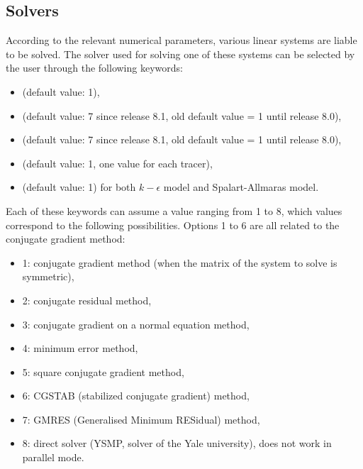 \subsection{Solvers}
\label{sec:solver}
According to the relevant numerical parameters, various linear systems are
liable to be solved. The solver used for solving one of these systems can be
selected by the user through the following keywords:

\begin{itemize}
\item {} (default value: 1),

\item {} (default value: 7
  since release 8.1, old default value = 1 until release 8.0),

\item {} (default value: 7
  since release 8.1, old default value = 1 until release 8.0),

%
\item {} (default value: 1, one value for
each tracer),

\item {} (default value: 1)
for both $k-\epsilon$ model and Spalart-Allmaras model.
\end{itemize}

Each of these keywords can assume a value ranging from 1 to 8, which values
correspond to the following possibilities.
Options 1 to 6 are all related to the conjugate gradient method:

\begin{itemize}
\item 1: conjugate gradient method (when the matrix of the system to solve
is symmetric),

\item 2: conjugate residual method,

\item 3: conjugate gradient on a normal equation method,

\item 4: minimum error method,

\item 5: square conjugate gradient method,

\item 6: CGSTAB (stabilized conjugate gradient) method,

\item 7: GMRES (Generalised Minimum RESidual) method,

\item 8: direct solver (YSMP, solver of the Yale university),
does not work in parallel mode.
\end{itemize}


